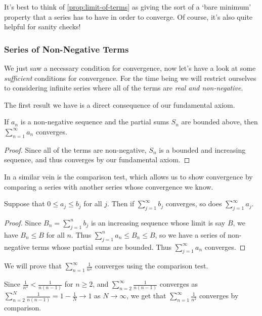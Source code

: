 \documentclass[a4paper]{scrartcl}
\begin{document}
It's best to think of \autoref{prop:limit-of-terms} as giving the sort of a `bare minimum' property that a series has to have in order to converge. Of course, it's also quite helpful for sanity checks!

\subsubsection{Series of Non-Negative Terms}

We just saw a necessary condition for convergence, now let's have a look at some \emph{sufficient} conditions for convergence. For the time being we will restrict ourselves to considering infinite series where all of the terms are \emph{real and non-negative}.

The first result we have is a direct consequence of our fundamental axiom.

\begin{theorem}
	If $a_n$ is a non-negative sequence and the partial sums $S_n$ are bounded above, then $\sum_{n = 1}^{\infty} a_n$ converges.
\end{theorem}
\begin{proof}
	Since all of the terms are non-negative, $S_n$ is a bounded and increasing sequence, and thus converges by our fundamental axiom.
\end{proof}

In a similar vein is the comparison test, which allows us to show convergence by comparing a series with another series whose convergence we know.

\begin{theorem}
	Suppose that $0 \leq a_j \leq b_j$ for all $j$. Then if $\sum_{j = 1}^{\infty} b_j$ converges, so does $\sum_{j = 1}^{\infty} a_j$.
\end{theorem}
\begin{proof}
	Since $B_n = \sum_{j = 1}^n b_j$ is an increasing sequence whose limit is say $B$, we have $B_n \leq B$ for all $n$. 
	Thus $\sum_{j = 1}^n a_n \leq B_n \leq B$, so we have a series of non-negative terms whose partial sums are bounded. Thus $\sum_{j = 1}^\infty a_n$ converges.
\end{proof}

\begin{example}
	We will prove that $\sum_{n = 1}^{\infty} \frac{1}{n^2}$ converges using the comparison test.

	Since $\frac{1}{n^2} < \frac{1}{n(n - 1)}$ for $n \geq 2$, and $\sum_{n = 2}^{\infty} \frac{1}{n(n - 1)}$ converges as
	$\sum_{n = 2}^N \frac{1}{n(n - 1)} = 1 - \frac{1}{N} \rightarrow 1$ as $N \rightarrow \infty$, we get that $\sum_{n = 1}^{\infty} \frac{1}{n^2}$ converges by comparison.
\end{example}
\end{document}
